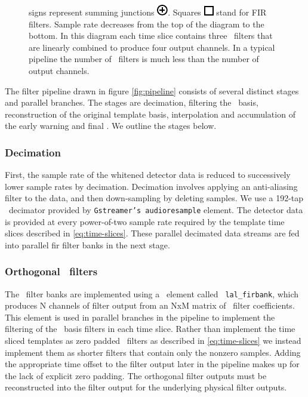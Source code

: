 \begin{figure}[htbp]
{signs represent summing junctions
\protect\includegraphics{figures/adder-symbol.pdf}.  Squares
\protect\includegraphics{figures/fir-symbol.pdf} stand for FIR filters.  Sample
rate decreases from the top of the diagram to the bottom.  In this diagram each
time slice contains three \fir\ filters that are linearly combined to produce
four output channels.  In a typical pipeline the number of \fir\ filters is
much less than the number of output channels.}
\end{figure}

The filter pipeline drawn in figure \ref{fig:pipeline} consists of several
distinct stages and parallel branches.  The stages are decimation, filtering
the \SVD\ basis, reconstruction of the original template basis, interpolation
and accumulation of the early warning and final {\SNR}.  We outline the stages
below. 

\subsubsection{Decimation}

First, the sample rate of the whitened detector data is reduced to successively
lower sample rates by decimation.  Decimation involves applying an anti-aliasing
filter to the data, and then down-sampling by deleting samples.  We use a
192-tap \fir\ decimator provided by {\tt Gstreamer's audioresample}
element.  The detector data is provided at every power-of-two sample rate
required by the template time slices described in \eqref{eq:time-slices}.  These
parallel decimated data streams are fed into parallel fir filter banks in the
next stage.

\subsubsection{Orthogonal \fir\ filters}

The \fir\ filter banks are implemented using a \gstlal\ element called {\tt
lal\_firbank}, which produces N channels of filter output from an NxM matrix of
\fir\ filter coefficients.  This element is used in parallel branches in the
pipeline to implement the filtering of the \SVD\ basis filters in each time
slice.  Rather than implement the time sliced templates as zero padded \fir\
filters as described in \eqref{eq:time-slices} we instead implement them as shorter
filters that contain only the nonzero samples.  Adding the appropriate time
offset to the filter output later in the pipeline makes up for the lack of
explicit zero padding.  The orthogonal filter outputs must be reconstructed
into the filter output for the underlying physical filter outputs. 

